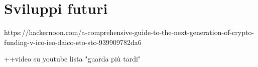 \chapter{Sviluppi futuri}
https://hackernoon.com/a-comprehensive-guide-to-the-next-generation-of-crypto-funding-v-ico-ieo-daico-eto-sto-939909782da6

++video su youtube lista "guarda più tardi"